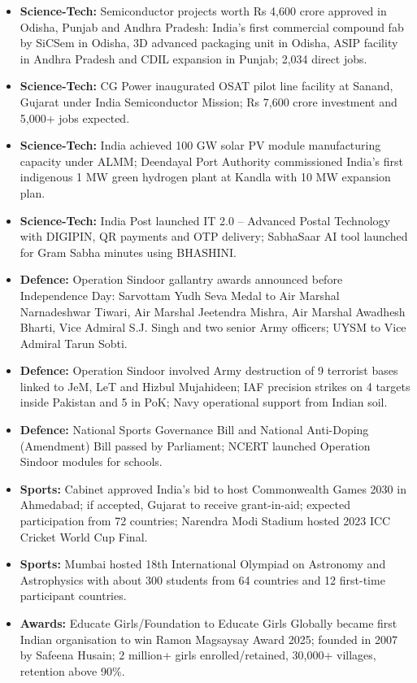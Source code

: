 \documentclass[10pt,a4paper]{article}
\begin{document}
\begin{itemize}
    \item \textbf{Science-Tech:} Semiconductor projects worth Rs 4,600 crore approved in Odisha, Punjab and Andhra Pradesh: India's first commercial compound fab by SiCSem in Odisha, 3D advanced packaging unit in Odisha, ASIP facility in Andhra Pradesh and CDIL expansion in Punjab; 2,034 direct jobs.
    \item \textbf{Science-Tech:} CG Power inaugurated OSAT pilot line facility at Sanand, Gujarat under India Semiconductor Mission; Rs 7,600 crore investment and 5,000+ jobs expected.
    \item \textbf{Science-Tech:} India achieved 100 GW solar PV module manufacturing capacity under ALMM; Deendayal Port Authority commissioned India's first indigenous 1 MW green hydrogen plant at Kandla with 10 MW expansion plan.
    \item \textbf{Science-Tech:} India Post launched IT 2.0 -- Advanced Postal Technology with DIGIPIN, QR payments and OTP delivery; SabhaSaar AI tool launched for Gram Sabha minutes using BHASHINI.
    \item \textbf{Defence:} Operation Sindoor gallantry awards announced before Independence Day: Sarvottam Yudh Seva Medal to Air Marshal Narnadeshwar Tiwari, Air Marshal Jeetendra Mishra, Air Marshal Awadhesh Bharti, Vice Admiral S.J. Singh and two senior Army officers; UYSM to Vice Admiral Tarun Sobti.
    \item \textbf{Defence:} Operation Sindoor involved Army destruction of 9 terrorist bases linked to JeM, LeT and Hizbul Mujahideen; IAF precision strikes on 4 targets inside Pakistan and 5 in PoK; Navy operational support from Indian soil.
    \item \textbf{Defence:} National Sports Governance Bill and National Anti-Doping (Amendment) Bill passed by Parliament; NCERT launched Operation Sindoor modules for schools.
    \item \textbf{Sports:} Cabinet approved India's bid to host Commonwealth Games 2030 in Ahmedabad; if accepted, Gujarat to receive grant-in-aid; expected participation from 72 countries; Narendra Modi Stadium hosted 2023 ICC Cricket World Cup Final.
    \item \textbf{Sports:} Mumbai hosted 18th International Olympiad on Astronomy and Astrophysics with about 300 students from 64 countries and 12 first-time participant countries.
    \item \textbf{Awards:} Educate Girls/Foundation to Educate Girls Globally became first Indian organisation to win Ramon Magsaysay Award 2025; founded in 2007 by Safeena Husain; 2 million+ girls enrolled/retained, 30,000+ villages, retention above 90\%.

\end{itemize}
\end{document}
